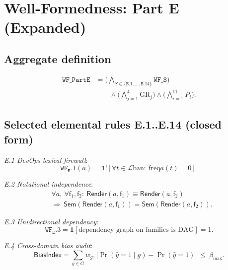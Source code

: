\documentclass[conference]{IEEEtran}
\begin{document}
\section{Well-Formedness: Part E (Expanded)}
\subsection{Aggregate definition}
\begin{equation}
\label{eq:wf-part-e}
\begin{aligned}
\mathtt{WF\_PartE}
&=\Big(\!\bigwedge_{S\in\{\mathtt{E.1},\ldots,\mathtt{E.14}\}}\mathtt{WF\_S}\Big)\\
&\qquad{}\wedge\Big(\!\bigwedge_{j=1}^{4}\mathrm{GR}_{j}\Big)
\wedge\Big(\!\bigwedge_{i=1}^{11}P_{i}\Big).
\end{aligned}
\end{equation}

\subsection{Selected elemental rules E.1..E.14 (closed form)}
\noindent\emph{E.1 DevOps lexical firewall}:
\begin{equation}
\label{eq:e1}
\mathtt{WF_E.1}(a)=\mathbf{1}!\left[\forall t\in \mathcal{L}{\mathrm{ban}}:\ \mathrm{freq}{a}(t)=0\right].
\end{equation}

\noindent\emph{E.2 Notational independence}:
\begin{equation}
\label{eq:e2}
\begin{aligned}
&\forall a,\ \forall \mathrm{f}_1,\mathrm{f}_2:\ 
\mathsf{Render}(a,\mathrm{f}_1)\equiv \mathsf{Render}(a,\mathrm{f}_2)\\
&\Rightarrow\ 
\mathsf{Sem}(\mathsf{Render}(a,\mathrm{f}_1))=\mathsf{Sem}(\mathsf{Render}(a,\mathrm{f}_2)).
\end{aligned}
\end{equation}

\noindent\emph{E.3 Unidirectional dependency}:
\begin{equation}
\label{eq:e3}
\mathtt{WF_E.3}=\mathbf{1}[\text{dependency graph on families is DAG}]=1.
\end{equation}

\noindent\emph{E.4 Cross-domain bias audit}:
\begin{equation}
\label{eq:e4}
\mathsf{BiasIndex}=\sum_{g\in G}w_g,\big|\Pr(\hat{y}=1\mid g)-\Pr(\hat{y}=1)\big|\ \le\ \beta_{\max}.
\end{equation}
\end{document}
